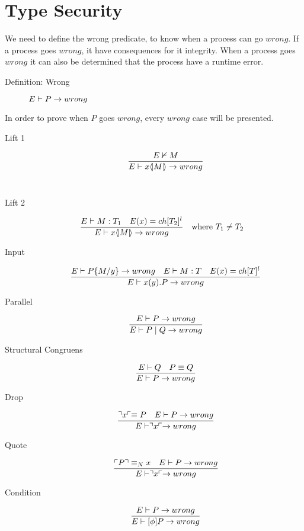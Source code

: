 \section{Type Security}
We need to define the wrong predicate, to know when a process can go $wrong$. If a process goes $wrong$, it have consequences for it integrity. When a process goes $wrong$ it can also be determined that the process have a runtime error.
\begin{description}
    \item[Definition: Wrong] $E \vdash P \rightarrow wrong$
\end{description}
    
    In order to prove when $P$ goes $wrong$, every $wrong$ case will be presented.
\begin{description}
    \item[Lift 1] \begin{align*}
        \frac{E \nvdash M}{E \vdash x \langle \! | M | \! \rangle \rightarrow wrong}
    \end{align*}\\
        
    \item[Lift 2] \begin{align*}
            \frac{E \vdash M:T_1 \quad E(x)=ch[T_2]^l}{E \vdash x \langle \! | M | \! \rangle \rightarrow wrong} &\quad \text{where}\ T_1 \neq T_2
    \end{align*}

    \item[Input] \begin{align*}
        \frac{E \vdash P\{ M/ y\} \rightarrow wrong \quad E \vdash M:T \quad E(x)= ch[T]^l} {E \vdash x(y).P \rightarrow wrong}\\
    \end{align*}

    \item[Parallel] \begin{align*}
        \frac{E \vdash P \rightarrow wrong}{E \vdash P \mid Q \rightarrow wrong}
    \end{align*}

    \item[Structural Congruens] \begin{align*}
        \frac{E \vdash Q \quad P \equiv Q}{E \vdash P \rightarrow wrong}
    \end{align*}

    \item[Drop]\begin{align*}
        \frac{\urcorner x \ulcorner \equiv P \quad E \vdash P \rightarrow wrong}{E \vdash \urcorner x \ulcorner \rightarrow wrong}
    \end{align*}

    \item[Quote]\begin{align*}
        \frac{\ulcorner P \urcorner \equiv _N x \quad E \vdash P \rightarrow wrong}{E \vdash \urcorner x \ulcorner \rightarrow wrong}
    \end{align*}

    \item[Condition]\begin{align*}
        \frac{E \vdash P \rightarrow wrong}{E \vdash [\phi]P \rightarrow wrong}
    \end{align*}
\end{description}


